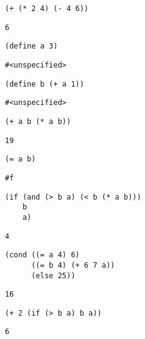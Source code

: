\documentclass[11pt]{article}
\begin{document}
\begin{verbatim}
(+ (* 2 4) (- 4 6))
\end{verbatim}

\begin{verbatim}
6
\end{verbatim}


\begin{verbatim}
(define a 3)
\end{verbatim}

\begin{verbatim}
#<unspecified>
\end{verbatim}


\begin{verbatim}
(define b (+ a 1))
\end{verbatim}

\begin{verbatim}
#<unspecified>
\end{verbatim}


\begin{verbatim}
(+ a b (* a b))
\end{verbatim}

\begin{verbatim}
19
\end{verbatim}


\begin{verbatim}
(= a b)
\end{verbatim}

\begin{verbatim}
#f
\end{verbatim}


\begin{verbatim}
(if (and (> b a) (< b (* a b)))
    b
    a)
\end{verbatim}

\begin{verbatim}
4
\end{verbatim}


\begin{verbatim}
(cond ((= a 4) 6)
      ((= b 4) (+ 6 7 a))
      (else 25))
\end{verbatim}

\begin{verbatim}
16
\end{verbatim}


\begin{verbatim}
(+ 2 (if (> b a) b a))
\end{verbatim}

\begin{verbatim}
6
\end{verbatim}
\end{document}
